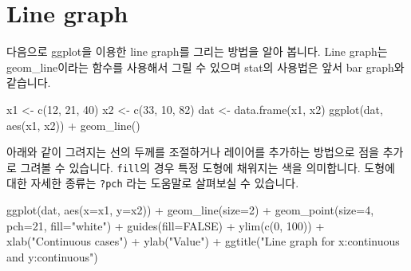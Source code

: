 \documentclass[
]{book}
\newenvironment{Shaded}{\begin{snugshade}}{\end{snugshade}}
\newcommand{\AttributeTok}[1]{\textcolor[rgb]{0.77,0.63,0.00}{#1}}
\newcommand{\ConstantTok}[1]{\textcolor[rgb]{0.00,0.00,0.00}{#1}}
\newcommand{\DecValTok}[1]{\textcolor[rgb]{0.00,0.00,0.81}{#1}}
\newcommand{\FunctionTok}[1]{\textcolor[rgb]{0.00,0.00,0.00}{#1}}
\newcommand{\NormalTok}[1]{#1}
\newcommand{\OtherTok}[1]{\textcolor[rgb]{0.56,0.35,0.01}{#1}}
\newcommand{\SpecialCharTok}[1]{\textcolor[rgb]{0.00,0.00,0.00}{#1}}
\newcommand{\StringTok}[1]{\textcolor[rgb]{0.31,0.60,0.02}{#1}}
\begin{document}
\hypertarget{line-graph}{%
\section{Line graph}\label{line-graph}}

다음으로 ggplot을 이용한 line graph를 그리는 방법을 알아 봅니다. Line graph는 geom\_line이라는 함수를 사용해서 그릴 수 있으며 stat의 사용법은 앞서 bar graph와 같습니다.

\begin{Shaded}
\begin{Highlighting}[]
\NormalTok{x1 }\OtherTok{\textless{}{-}} \FunctionTok{c}\NormalTok{(}\DecValTok{12}\NormalTok{, }\DecValTok{21}\NormalTok{, }\DecValTok{40}\NormalTok{)}
\NormalTok{x2 }\OtherTok{\textless{}{-}} \FunctionTok{c}\NormalTok{(}\DecValTok{33}\NormalTok{, }\DecValTok{10}\NormalTok{, }\DecValTok{82}\NormalTok{)}
\NormalTok{dat }\OtherTok{\textless{}{-}} \FunctionTok{data.frame}\NormalTok{(x1, x2)}
\FunctionTok{ggplot}\NormalTok{(dat, }\FunctionTok{aes}\NormalTok{(x1, x2)) }\SpecialCharTok{+}
  \FunctionTok{geom\_line}\NormalTok{()}
\end{Highlighting}
\end{Shaded}

아래와 같이 그려지는 선의 두께를 조절하거나 레이어를 추가하는 방법으로 점을 추가로 그려볼 수 있습니다. \texttt{fill}의 경우 특정 도형에 채워지는 색을 의미합니다. 도형에 대한 자세한 종류는 \texttt{?pch} 라는 도움말로 살펴보실 수 있습니다.

\begin{Shaded}
\begin{Highlighting}[]
\FunctionTok{ggplot}\NormalTok{(dat, }\FunctionTok{aes}\NormalTok{(}\AttributeTok{x=}\NormalTok{x1, }\AttributeTok{y=}\NormalTok{x2)) }\SpecialCharTok{+}
  \FunctionTok{geom\_line}\NormalTok{(}\AttributeTok{size=}\DecValTok{2}\NormalTok{) }\SpecialCharTok{+}
  \FunctionTok{geom\_point}\NormalTok{(}\AttributeTok{size=}\DecValTok{4}\NormalTok{, }\AttributeTok{pch=}\DecValTok{21}\NormalTok{, }\AttributeTok{fill=}\StringTok{"white"}\NormalTok{) }\SpecialCharTok{+}
  \FunctionTok{guides}\NormalTok{(}\AttributeTok{fill=}\ConstantTok{FALSE}\NormalTok{) }\SpecialCharTok{+}
  \FunctionTok{ylim}\NormalTok{(}\FunctionTok{c}\NormalTok{(}\DecValTok{0}\NormalTok{, }\DecValTok{100}\NormalTok{)) }\SpecialCharTok{+}
  \FunctionTok{xlab}\NormalTok{(}\StringTok{"Continuous cases"}\NormalTok{) }\SpecialCharTok{+} \FunctionTok{ylab}\NormalTok{(}\StringTok{"Value"}\NormalTok{) }\SpecialCharTok{+}
  \FunctionTok{ggtitle}\NormalTok{(}\StringTok{"Line graph for x:continuous and y:continuous"}\NormalTok{)}
\end{Highlighting}
\end{Shaded}
\end{document}
